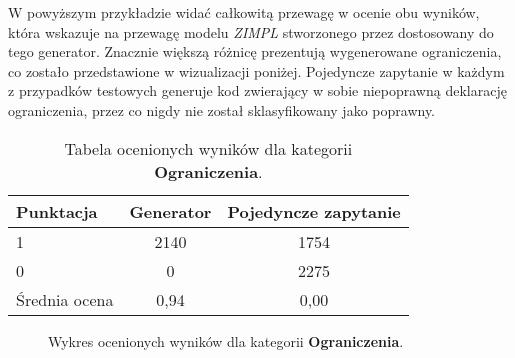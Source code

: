 W powyższym przykładzie widać całkowitą przewagę w ocenie obu wyników, która wskazuje na przewagę modelu  \textit{ZIMPL} stworzonego przez dostosowany do tego generator. Znacznie większą różnicę prezentują wygenerowane ograniczenia, co zostało przedstawione w wizualizacji poniżej. Pojedyncze zapytanie w każdym z przypadków testowych generuje kod zwierający w sobie niepoprawną deklarację ograniczenia, przez co nigdy nie został sklasyfikowany jako poprawny.

\begin{table}[ht]
\caption{Tabela ocenionych wyników dla kategorii \textbf{Ograniczenia}.}\label{tab:tabela14}
\centering%
\begin{tabular}{|l|c|c|}
\hline
\textbf{Punktacja} & \textbf{Generator} & \textbf{Pojedyncze zapytanie}\\
\hline
1 & 2140 & 1754 \\
\hline
0 & 0 & 2275 \\
\hline
Średnia ocena & 0,94 & 0,00 \\
\hline
\end{tabular}
\end{table}

\begin{figure}[H]
\centering
\begin{minipage}{0.45\textwidth}
\centering
{}
\end{minipage}%
\hspace{0.05\textwidth}
\begin{minipage}{0.45\textwidth}
\centering
{}
\end{minipage}
\caption{Wykres ocenionych wyników dla kategorii \textbf{Ograniczenia}.}
\end{figure}

